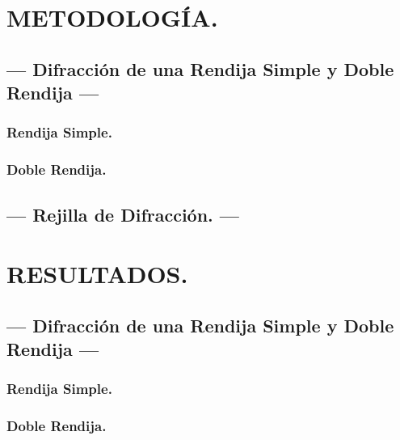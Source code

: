 \documentclass[12pt,a4paper]{article}
\begin{document}
\section{METODOLOGÍA.} %

\subsection{--- Difracción de una Rendija Simple y Doble Rendija ---} %
\label{sub:difraccion_simple}

\subsubsection{Rendija Simple.} %
\label{subs:rendija_simple}

\subsubsection{Doble Rendija.} %
\label{subs:doble_rendija}



\subsection{--- Rejilla de Difracción. ---} %
\label{sub:reijlla_de_difraccion}


\section{RESULTADOS.} %

\subsection{--- Difracción de una Rendija Simple y Doble Rendija ---} %
\label{sub:resul_difraccion_simple}

\subsubsection{Rendija Simple.} %
\label{subs:resul_rendija_simple}

\subsubsection{Doble Rendija.} %
\label{subs:resul_doble_rendija}
\end{document}
